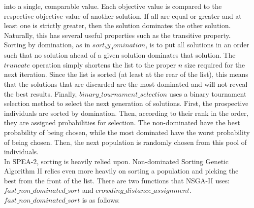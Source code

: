 \documentclass{article}
\begin{document}
    into a single, comparable value. Each objective value is compared to the respective objective value of another solution. If all are equal or greater and 
    at least one is strictly greater, then the solution dominates the other solution. Naturally, this has several useful properties such as the transitive 
    property. Sorting by domination, as in \(sort_by_domination\), is to put all solutions in an order such that no solution ahead of a given solution dominates 
    that solution. The \(truncate\) operation simply shortens the list to the proper \(n\) size required for the next iteration. Since the list is sorted (at 
    least at the rear of the list), this means that the solutions that are discarded are the most dominated and will not reveal the best results. Finally, 
    \(binary\_tournament\_selection\) uses a binary tournament selection method to select the next generation of solutions. First, the prospective individuals
    are sorted by domination. Then, according to their rank in the order, they are assigned probabilities for selection. The non-dominated have the best 
    probability of being chosen, while the most dominated have the worst probability of being chosen. Then, the next population is randomly chosen from this 
    pool of individuals. \cite{ZitzlerLaumannsThiele} \cite{KaucicMoradiMirzazadeh} \\
    In SPEA-2, sorting is heavily relied upon. Non-dominated Sorting Genetic Algorithm II relies even more heavily on sorting a population and picking the best from 
    the front of the list. There are two functions that NSGA-II uses: \(fast\_non\_dominated\_sort\) and \(crowding\_distance\_assignment\). \(fast\_non\_dominated\_sort\)
    is as follows:
\end{document}
